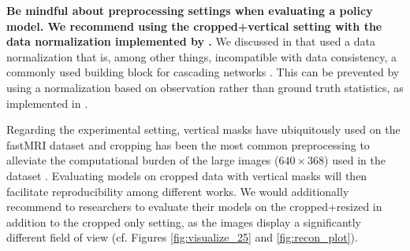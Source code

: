 \textbf{Be mindful about preprocessing settings when evaluating a policy model. We recommend using the cropped+vertical setting with the data normalization implemented by \citet{zbontarFastMRIOpenDataset2019}.} We discussed in  that \citet{bakker2020experimental} used a data normalization that is, among other things, incompatible with data consistency, a commonly used building block for cascading networks \citep{schlemper2018deep,zhang2019reducing}. This can be prevented by using a normalization based on observation rather than ground truth statistics, as implemented in \citet{zbontarFastMRIOpenDataset2019}.

Regarding the experimental setting, vertical masks have ubiquitously used on the fastMRI dataset \citep{zbontarFastMRIOpenDataset2019,huijben2020learning,bakker2020experimental,pineda2020active} and cropping has been the most common preprocessing to alleviate the computational burden of the large images ($640\times368$) used in the dataset \citep{bakker2020experimental,Huijben2020Deep,yin2021end}. Evaluating models on cropped data with vertical masks will then facilitate reproducibility among different works. We would additionally recommend to researchers to evaluate their models on the cropped+resized in addition to the cropped only setting, as the images display a significantly different field of view (cf. Figures \ref{fig:visualize_25} and \ref{fig:recon_plot}). 
